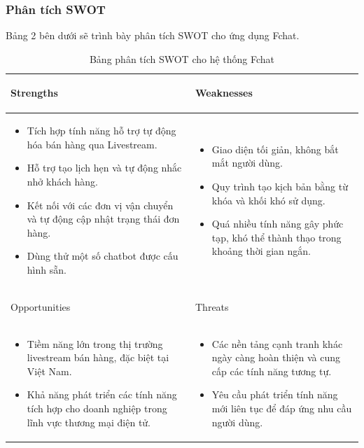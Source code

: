 \subsubsection{Phân tích SWOT}
Bảng 2 bên dưới sẽ trình bày phân tích SWOT cho ứng dụng Fchat.
\begin{table}[H]
\centering
\begin{tabular}{|p{7cm}|p{7cm}|}
\hline
 \begin{center}
     Strengths
 \end{center} & \begin{center}
     Weaknesses
 \end{center}  \\
\hline
\begin{itemize}
    \item Tích hợp tính năng hỗ trợ tự động hóa bán hàng qua Livestream.
    \item Hỗ trợ tạo lịch hẹn và tự động nhắc nhở khách hàng.
    \item Kết nối với các đơn vị vận chuyển và tự động cập nhật trạng thái đơn hàng.
    \item Dùng thử một số chatbot được cấu hình sẵn.
\end{itemize} &  
\begin{itemize}
    \item Giao diện tối giản, không bắt mắt người dùng.
    \item Quy trình tạo kịch bản bằng từ khóa và khối khó sử dụng.
    \item Quá nhiều tính năng gây phức tạp, khó thể thành thạo trong khoảng thời gian ngắn.
\end{itemize}\\
\hline
\begin{center}
    Opportunities
\end{center} & \begin{center}
    Threats
\end{center}\\
\hline
\begin{itemize}
    \item Tiềm năng lớn trong thị trường livestream bán hàng, đặc biệt tại Việt Nam.
\item Khả năng phát triển các tính năng tích hợp cho doanh nghiệp trong lĩnh vực thương mại điện tử.
\end{itemize} &  
\begin{itemize}
    \item Các nền tảng cạnh tranh khác ngày càng hoàn thiện và cung cấp các tính năng tương tự.
\item Yêu cầu phát triển tính năng mới liên tục để đáp ứng nhu cầu người dùng.
\end{itemize}\\
\hline
\end{tabular}
\caption{Bảng phân tích SWOT cho hệ thống Fchat}
\end{table}

